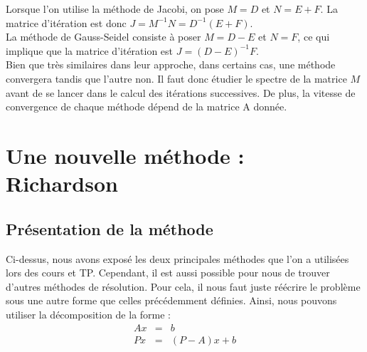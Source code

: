 Lorsque l'on utilise la méthode de Jacobi, on pose $M = D$ et $N = E+F$. La matrice d'itération est donc $J = M^{-1}N = D^{-1}(E+F)$.\\

La méthode de Gauss-Seidel consiste à poser $M = D-E$ et $N = F$, ce qui implique que la matrice d'itération est $J = (D-E)^{-1}F$.\\

Bien que très similaires dans leur approche, dans certains cas, une méthode convergera tandis que l'autre non. Il faut donc étudier le spectre de la matrice $M$ avant de se lancer dans le calcul des itérations successives. De plus, la vitesse de convergence de chaque méthode dépend de la matrice A donnée.



\section{Une nouvelle méthode : Richardson}
\subsection{Présentation de la méthode}
Ci-dessus, nous avons exposé les deux principales méthodes que l'on a utilisées lors des cours et TP. Cependant, il est aussi possible pour nous de trouver d'autres méthodes de résolution. Pour cela, il nous faut juste réécrire le problème sous une autre forme que celles précédemment définies. Ainsi, nous pouvons utiliser la décomposition de la forme :  
\begin{eqnarray}
Ax &=& b\\
Px &=& (P - A)x + b
\end{eqnarray}

